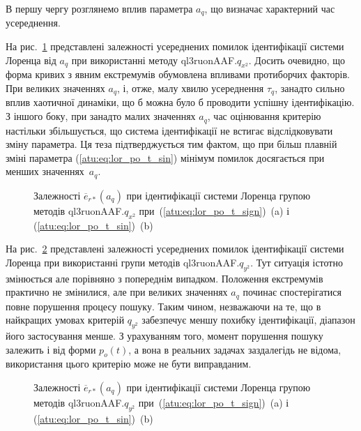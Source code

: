 В першу чергу розглянемо вплив параметра
$a_q$, що визначає характерний час усереднення.

На рис.~\ref{atu:f:lor_a_q_ql3ruonAAF.q_x2} представлені залежності усереднених
помилок ідентифікації системи Лоренца від
$a_q $ при використанні методу
ql3ruonAAF.$q_{x^2}$.
Досить очевидно, що форма кривих з явним екстремумів обумовлена
впливами протиборчих факторів. При великих значеннях
$a_q$, і, отже, малу хвилю усереднення
$\tau_q $, занадто сильно вплив хаотичної динаміки, що б можна було
б проводити успішну ідентифікацію. З іншого боку, при занадто
малих значеннях
$a_q$, час оцінювання критерію настільки збільшується, що система
ідентифікації не встигає відслідковувати зміну параметра. Ця
теза підтверджується тим фактом, що при більш плавній зміні
параметра (\ref{atu:eq:lor_po_t_sin}) мінімум помилок досягається при
менших значеннях~$a_q$.

\begin{figure}[htb!]
  \caption{Залежності $ \overline{e}_{r *} (a_q) $ при ідентифікації системи Лоренца групою методів ql3ruonAAF.$q_{x^2} $ при~(\ref{atu:eq:lor_po_t_sign})~(a) і (\ref{atu:eq:lor_po_t_sin})~(b)}
  \label{atu:f:lor_a_q_ql3ruonAAF.q_x2}
\end{figure}


На рис.~\ref{atu:f:lor_a_q_ql3ruonAAF.q_y2} представлені залежності усереднених
помилок ідентифікації системи Лоренца при використанні групи методів ql3ruonAAF.$q_{y^2}$.
Тут ситуація істотно змінюється але порівняно з
попереднім випадком. Положення екстремумів практично не
змінилися, але при великих значеннях
$a_q $ починає спостерігатися повне порушення процесу
пошуку. Таким чином, незважаючи на те, що в найкращих умовах
критерій
$q_{y^2} $ забезпечує меншу похибку ідентифікації, діапазон його
застосування менше. З урахуванням того, момент порушення пошуку
залежить і від форми
$p_o (t) $, а вона в реальних задачах заздалегідь не відома,
використання цього критерію може не бути виправданим.

\begin{figure}[htb!]
  \caption{Залежності $ \overline{e}_{r *} (a_q) $ при ідентифікації системи Лоренца групою методів ql3ruonAAF.$q_{y^2} $ при~(\ref{atu:eq:lor_po_t_sign})~(a) і (\ref{atu:eq:lor_po_t_sin})~(b)}
  \label{atu:f:lor_a_q_ql3ruonAAF.q_y2}
\end{figure}



